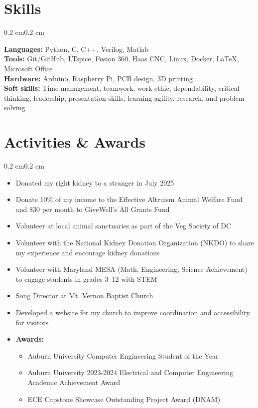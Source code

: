 \documentclass[10pt, letterpaper]{article}
\newenvironment{highlights}{
    \begin{itemize}[topsep=0.10 cm,parsep=0.10 cm,partopsep=0pt,itemsep=0pt,leftmargin=0.4 cm + 10pt]
}{
    \end{itemize}
}
\newenvironment{onecolentry}{
    \begin{adjustwidth}{0.2 cm}{0.2 cm}
}{
    \end{adjustwidth}
}
\begin{document}
    \section{Skills}
        \begin{onecolentry}
            \textbf{Languages:} Python, C, C++, Verilog, Matlab \\
            \textbf{Tools:} Git/GitHub, LTspice, Fusion 360, Haas CNC, Linux, Docker, \LaTeX, Microsoft Office \\
            \textbf{Hardware:} Arduino, Raspberry Pi, PCB design, 3D printing \\
            \textbf{Soft skills:} Time management, teamwork, work ethic, dependability, critical thinking, leadership, presentation skills, learning agility,
            research, and problem solving
        \end{onecolentry}

    \section{Activities \& Awards}
        \begin{onecolentry}
            \begin{highlights}
                \item Donated my right kidney to a stranger in July 2025
                \item Donate 10\% of my income to the Effective Altruism Animal Welfare Fund and \$30 per month to GiveWell's All Grants Fund
                \item Volunteer at local animal sanctuaries as part of the Veg Society of DC
                \item Volunteer with the National Kidney Donation Organization (NKDO) to share my experience and encourage kidney donations
                \item Volunteer with Maryland MESA (Math, Engineering, Science Achievement) to engage students in grades 3–12 with STEM
                \item Song Director at Mt. Vernon Baptist Church
                \item Developed a website for my church to improve coordination and accessibility for visitors
                \item \textbf{Awards:} 
                \begin{highlights}
                    \item Auburn University Computer Engineering Student of the Year
                    \item Auburn University 2023-2024 Electrical and Computer Engineering Academic Achievement Award
                    \item ECE Capstone Showcase Outstanding Project Award (DNAM)
                \end{highlights}
            \end{highlights}
        \end{onecolentry}
\end{document}
